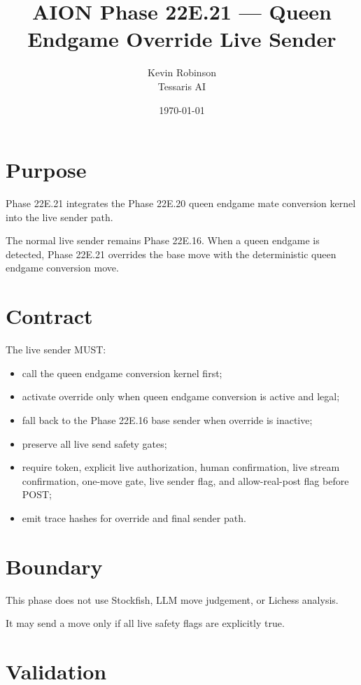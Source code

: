 \documentclass[11pt,a4paper]{article}
\title{\textbf{AION Phase 22E.21 --- Queen Endgame Override Live Sender}}
\author{Kevin Robinson\\Tessaris AI}
\date{\today}
\begin{document}
\maketitle

\section{Purpose}

Phase 22E.21 integrates the Phase 22E.20 queen endgame mate conversion kernel into the live sender path.

The normal live sender remains Phase 22E.16. When a queen endgame is detected, Phase 22E.21 overrides the base move with the deterministic queen endgame conversion move.

\section{Contract}

The live sender MUST:

\begin{itemize}[leftmargin=*]
  \item call the queen endgame conversion kernel first;
  \item activate override only when queen endgame conversion is active and legal;
  \item fall back to the Phase 22E.16 base sender when override is inactive;
  \item preserve all live send safety gates;
  \item require token, explicit live authorization, human confirmation, live stream confirmation, one-move gate, live sender flag, and allow-real-post flag before POST;
  \item emit trace hashes for override and final sender path.
\end{itemize}

\section{Boundary}

This phase does not use Stockfish, LLM move judgement, or Lichess analysis.

It may send a move only if all live safety flags are explicitly true.

\section{Validation}
\end{document}
